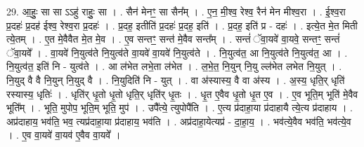 \documentclass[17pt]{extarticle}
\begin{document}
29. आ॒हुः॒ सा सा ऽऽहु॑ राहुः॒ सा । . सैन॑ मेनꣳ॒॒ सा सैन᳚म् । . ए॒न॒ मी॒श्व॒ रेश्व॒ रैन॑ मेन मीश्व॒रा । . ई॒श्व॒रा प्र॒दहः॑ प्र॒दह॑ ईश्व॒ रेश्व॒रा प्र॒दहः॑ । . प्र॒दह॒ इतीति॑ प्र॒दहः॑ प्र॒दह॒ इति॑ । . प्र॒दह॒ इति॑ प्र - दहः॑ । . इत्ये॒त मे॒त मिती त्ये॒तम् । . ए॒त मे॒वैवैत मे॒त मे॒व । . ए॒व सन्तꣳ॒॒ सन्त॑ मे॒वैव सन्त᳚म् । . सन्तं॑ ॅवा॒यवे॑ वा॒यवे॒ सन्तꣳ॒॒ सन्तं॑ ॅवा॒यवे᳚ । . वा॒यवे॑ नि॒युत्व॑ते नि॒युत्व॑ते वा॒यवे॑ वा॒यवे॑ नि॒युत्व॑ते । . नि॒युत्व॑त॒ आ नि॒युत्व॑ते नि॒युत्व॑त॒ आ । . नि॒युत्व॑त॒ इति॑ नि - युत्व॑ते । . आ ल॑भेत लभे॒ता ल॑भेत । . ल॒भे॒त॒ नि॒युन् नि॒यु ल्ल॑भेत लभेत नि॒युत् । . नि॒युद् वै वै नि॒युन् नि॒युद् वै । . नि॒युदिति॑ नि - युत् । . वा अ॑स्यास्य॒ वै वा अ॑स्य । . अ॒स्य॒ धृति॒र् धृति॑ रस्यास्य॒ धृतिः॑ । . धृति॑र् धृ॒तो धृ॒तो धृति॒र् धृति॑र् धृ॒तः । . धृ॒त ए॒वैव धृ॒तो धृ॒त ए॒व । . ए॒व भूति॒म् भूति॑ मे॒वैव भूति᳚म् । . भूति॒ मुपोप॒ भूति॒म् भूति॒ मुप॑ । . उपै᳚त्ये॒ त्युपोपै॑ति । . ए॒त्य प्र॑दाहा॒या प्र॑दाहायै त्ये॒त्य प्र॑दाहाय । . अप्र॑दाहाय॒ भव॑ति॒ भव॒ त्यप्र॑दाहा॒या प्र॑दाहाय॒ भव॑ति । . अप्र॑दाहा॒येत्यप्र॑ - दा॒हा॒य॒ । . भव॑त्ये॒वैव भव॑ति॒ भव॑त्ये॒व । . ए॒व वा॒यवे॑ वा॒यव॑ ए॒वैव वा॒यवे᳚ । \newline
\end{document}
